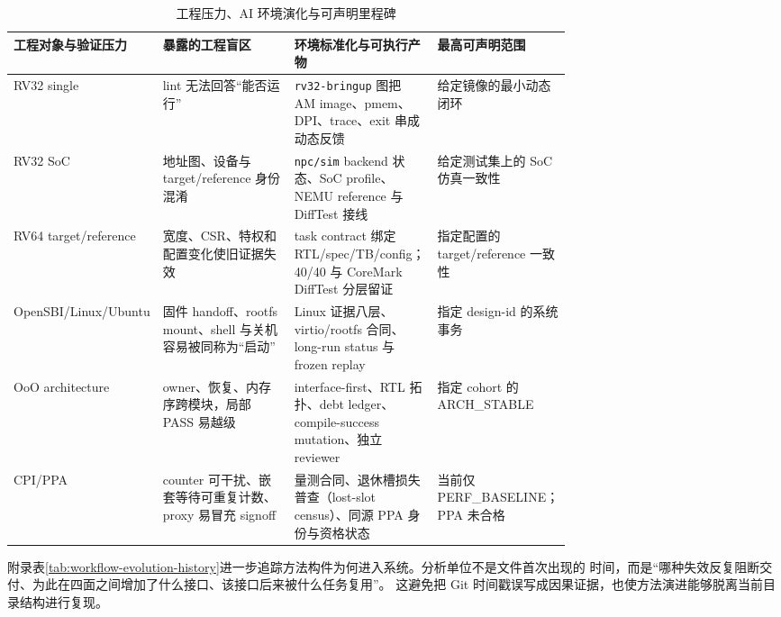 \documentclass[UTF8,a4paper,zihao=-4,oneside]{ctexart}
\begin{document}
\begin{table}[htbp]
  \centering
  \small
  \caption{工程压力、AI 环境演化与可声明里程碑}
  \label{tab:milestone-ladder}
  \begin{tabularx}{\linewidth}{@{}L{0.20\linewidth}L{0.27\linewidth}L{0.25\linewidth}Y@{}}
    \toprule
    工程对象与验证压力 & 暴露的工程盲区 & 环境标准化与可执行产物 & 最高可声明范围 \\
    \midrule
    RV32 single & lint 无法回答“能否运行” & \texttt{rv32-bringup} 图把 AM image、pmem、DPI、trace、exit 串成动态反馈 & 给定镜像的最小动态闭环 \\
    RV32 SoC & 地址图、设备与 target/reference 身份混淆 & \texttt{npc/sim} backend 状态、SoC profile、NEMU reference 与 DiffTest 接线 & 给定测试集上的 SoC 仿真一致性 \\
    RV64 target/reference & 宽度、CSR、特权和配置变化使旧证据失效 & task contract 绑定 RTL/spec/TB/config；40/40 与 CoreMark DiffTest 分层留证 & 指定配置的 target/reference 一致性 \\
    OpenSBI/Linux/\newline Ubuntu & 固件 handoff、rootfs mount、shell 与关机容易被同称为“启动” & Linux 证据八层、virtio/rootfs 合同、long-run status 与 frozen replay & 指定 design-id 的系统事务 \\
    OoO architecture & owner、恢复、内存序跨模块，局部 PASS 易越级 & interface-first、RTL 拓扑、debt ledger、compile-success mutation、独立 reviewer & 指定 cohort 的 ARCH\_STABLE \\
    CPI/PPA & counter 可干扰、嵌套等待可重复计数、proxy 易冒充 signoff & 量测合同、退休槽损失普查（lost-slot census）、同源 PPA 身份与资格状态 & 当前仅 PERF\_BASELINE；PPA 未合格 \\
    \bottomrule
  \end{tabularx}
\end{table}

附录表\ref{tab:workflow-evolution-history}进一步追踪方法构件为何进入系统。分析单位不是文件首次出现的
时间，而是“哪种失效反复阻断交付、为此在四面之间增加了什么接口、该接口后来被什么任务复用”。
这避免把 Git 时间戳误写成因果证据，也使方法演进能够脱离当前目录结构进行复现。
\end{document}
